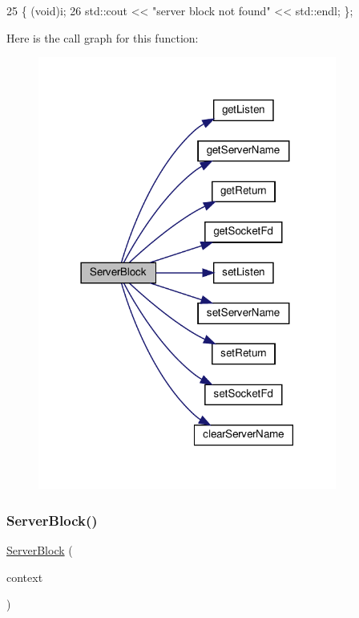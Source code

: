 \begin{DoxyCode}
25                                \{ (void)i;
26             std::cout << \textcolor{stringliteral}{"server block not found"} << std::endl; \};
\end{DoxyCode}
Here is the call graph for this function\+:
\nopagebreak
\begin{figure}[H]
\begin{center}
\leavevmode
\includegraphics[width=278pt]{classft_1_1_server_block_a592b14cd2e97683f3997e666c41e5009_cgraph}
\end{center}
\end{figure}
\mbox{\label{classft_1_1_server_block_ac14b720cf43fb61943107d397f5427f4}} 
\subsubsection{\texorpdfstring{Server\+Block()}{ServerBlock()}\hspace{0.1cm}{\footnotesize\ttfamily [2/2]}}
{\footnotesize\ttfamily \hyperlink{classft_1_1_server_block}{Server\+Block} (\begin{DoxyParamCaption}\item[{const \hyperlink{classft_1_1_base_directives}{Base\+Directives} \&}]{context }\end{DoxyParamCaption})}



